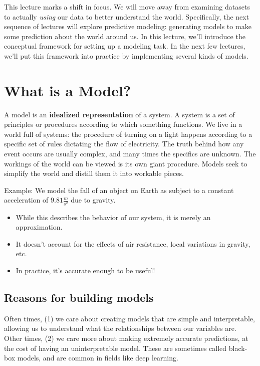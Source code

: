 \documentclass[
  letterpaper,
  DIV=11,
  numbers=noendperiod]{scrreprt}
\providecommand{\tightlist}{%
  \setlength{\itemsep}{0pt}\setlength{\parskip}{0pt}}\usepackage{longtable,booktabs,array}
\begin{document}
This lecture marks a shift in focus. We will move away from examining
datasets to actually \emph{using} our data to better understand the
world. Specifically, the next sequence of lectures will explore
predictive modeling: generating models to make some prediction about the
world around us. In this lecture, we'll introduce the conceptual
framework for setting up a modeling task. In the next few lectures,
we'll put this framework into practice by implementing several kinds of
models.

\hypertarget{what-is-a-model}{%
\section{What is a Model?}\label{what-is-a-model}}

A model is an \textbf{idealized representation} of a system. A system is
a set of principles or procedures according to which something
functions. We live in a world full of systems: the procedure of turning
on a light happens according to a specific set of rules dictating the
flow of electricity. The truth behind how any event occurs are usually
complex, and many times the specifics are unknown. The workings of the
world can be viewed is its own giant procedure. Models seek to simplify
the world and distill them it into workable pieces.

Example: We model the fall of an object on Earth as subject to a
constant acceleration of \(9.81 \frac{m}{s^2}\) due to gravity.

\begin{itemize}
\tightlist
\item
  While this describes the behavior of our system, it is merely an
  approximation.
\item
  It doesn't account for the effects of air resistance, local variations
  in gravity, etc.
\item
  In practice, it's accurate enough to be useful!
\end{itemize}

\hypertarget{reasons-for-building-models}{%
\subsection{Reasons for building
models}\label{reasons-for-building-models}}

Often times, (1) we care about creating models that are simple and
interpretable, allowing us to understand what the relationships between
our variables are. Other times, (2) we care more about making extremely
accurate predictions, at the cost of having an uninterpretable model.
These are sometimes called black-box models, and are common in fields
like deep learning.
\end{document}

